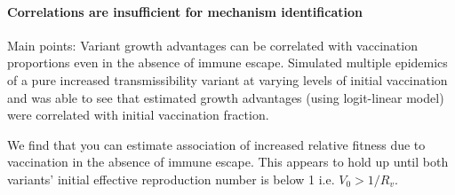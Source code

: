 \documentclass[12pt,oneside,letterpaper]{article}
\begin{document}







\paragraph{Correlations are insufficient for mechanism identification}%

Main points:
Variant growth advantages can be correlated with vaccination proportions even in the absence of immune escape.
Simulated multiple epidemics of a pure increased transmissibility variant at varying levels of initial vaccination and was able to see that estimated growth advantages (using logit-linear model) were correlated with initial vaccination fraction.

We find that you can estimate association of increased relative fitness due to vaccination in the absence of immune escape.
This appears to hold up until both variants' initial effective reproduction number is below 1 i.e. $V_{0} > 1 / R_{v}$.
\end{document}
